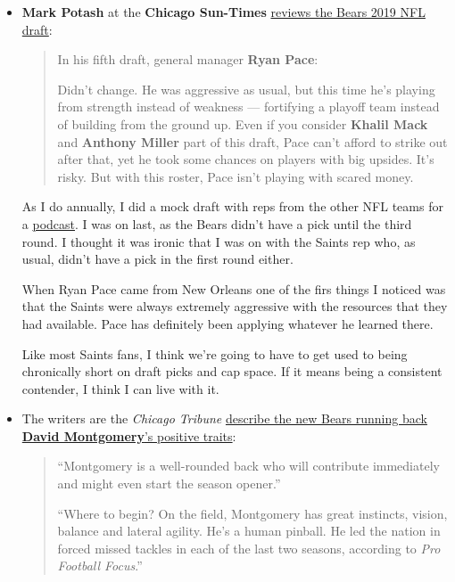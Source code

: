 \begin{itemize}
\item  \textbf{Mark Potash} at the \textbf{Chicago Sun-Times}  \href{https://chicago.suntimes.com/sports/mark-potash-analyzing-the-bears-2019-draft-class/}{reviews the Bears 2019 NFL draft}:

\begin{quote}
In his fifth draft, general manager \textbf{Ryan Pace}:

Didn’t change. He was aggressive as usual, but this time he’s playing from strength instead of weakness — fortifying a playoff team instead of building from the ground up. Even if you consider \textbf{Khalil Mack} and \textbf{Anthony Miller} part of this draft, Pace can’t afford to strike out after that, yet he took some chances on players with big upsides. It’s risky. But with this roster, Pace isn’t playing with scared money.
\end{quote}

As I do annually, I did a mock draft with reps from the other NFL teams for a \href{https://t.co/VWwtXBGEga}{podcast}.  I was on last, as the Bears didn't have a pick until the third round.  I thought it was ironic that I was on with the Saints rep who, as usual, didn't have a pick in the first round either.

When Ryan Pace came from New Orleans one of the firs things I noticed was that the Saints were always extremely aggressive with the resources that they had available.  Pace has definitely been applying whatever he learned there.

Like most Saints fans, I think we're going to have to get used to being chronically short on draft picks and cap space.  If it means being a consistent contender, I think I can live with it.

\item The writers are the \textit{Chicago Tribune} \href{https://www.chicagotribune.com/sports/football/bears/ct-spt-cb-chicago-bears-nfl-draft-picks-2019-story.html}{describe the new Bears running back \textbf{David Montgomery}'s positive traits}:

\begin{quote}
  ``Montgomery is a well-rounded back who will contribute immediately and might even start the season opener.''
  
``Where to begin? On the field, Montgomery has great instincts, vision, balance and lateral agility. He’s a human pinball. He led the nation in forced missed tackles in each of the last two seasons, according to \textit{Pro Football Focus}.''  
\end{quote}


\end{itemize}
